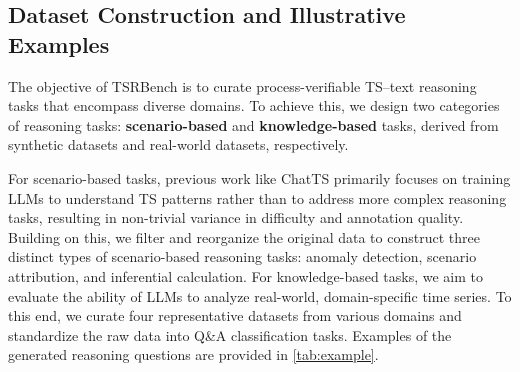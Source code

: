 \documentclass{article}
\theoremstyle{plain}
\theoremstyle{definition}
\theoremstyle{remark}
\begin{document}
\begin{table}[htbp]
\begin{tabular}{p{3.5cm}p{13cm}}
\bottomrule
\end{tabular}
\end{table}

\subsection{Dataset Construction and Illustrative Examples}

The objective of TSRBench is to curate process-verifiable TS–text reasoning tasks that encompass diverse domains. To achieve this, we design two categories of reasoning tasks: \textbf{scenario-based} and \textbf{knowledge-based} tasks, derived from synthetic datasets and real-world datasets, respectively.

For scenario-based tasks, previous work like ChatTS \cite{xie2025chatts} primarily focuses on training LLMs to understand TS patterns rather than to address more complex reasoning tasks, resulting in non-trivial variance in difficulty and annotation quality. Building on this, we filter and reorganize the original data to construct three distinct types of scenario-based reasoning tasks: anomaly detection, scenario attribution, and inferential calculation. For knowledge-based tasks, we aim to evaluate the ability of LLMs to analyze real-world, domain-specific time series. To this end, we curate four representative datasets from various domains and standardize the raw data into Q\&A classification tasks. Examples of the generated reasoning questions are provided in \autoref{tab:example}.
\end{document}
